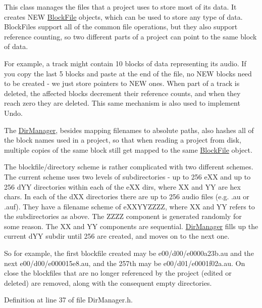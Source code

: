 This class manages the files that a project uses to store most of its data. It creates N\+EW \hyperlink{class_block_file}{Block\+File} objects, which can be used to store any type of data. Block\+Files support all of the common file operations, but they also support reference counting, so two different parts of a project can point to the same block of data.

For example, a track might contain 10 blocks of data representing its audio. If you copy the last 5 blocks and paste at the end of the file, no N\+EW blocks need to be created -\/ we just store pointers to N\+EW ones. When part of a track is deleted, the affected blocks decrement their reference counts, and when they reach zero they are deleted. This same mechanism is also used to implement Undo.

The \hyperlink{class_dir_manager}{Dir\+Manager}, besides mapping filenames to absolute paths, also hashes all of the block names used in a project, so that when reading a project from disk, multiple copies of the same block still get mapped to the same \hyperlink{class_block_file}{Block\+File} object.

The blockfile/directory scheme is rather complicated with two different schemes. The current scheme uses two levels of subdirectories -\/ up to 256 \textquotesingle{}e\+XX\textquotesingle{} and up to 256 \textquotesingle{}d\+YY\textquotesingle{} directories within each of the \textquotesingle{}e\+XX\textquotesingle{} dirs, where XX and YY are hex chars. In each of the d\+XX directories there are up to 256 audio files (e.\+g. .au or .auf). They have a filename scheme of \textquotesingle{}e\+X\+X\+Y\+Y\+Z\+Z\+ZZ\textquotesingle{}, where XX and YY refers to the subdirectories as above. The \textquotesingle{}Z\+Z\+ZZ\textquotesingle{} component is generated randomly for some reason. The XX and YY components are sequential. \hyperlink{class_dir_manager}{Dir\+Manager} fills up the current d\+YY subdir until 256 are created, and moves on to the next one.

So for example, the first blockfile created may be \textquotesingle{}e00/d00/e0000a23b.\+au\textquotesingle{} and the next \textquotesingle{}e00/d00/e000015e8.\+au\textquotesingle{}, and the 257th may be \textquotesingle{}e00/d01/e0001f02a.\+au\textquotesingle{}. On close the blockfiles that are no longer referenced by the project (edited or deleted) are removed, along with the consequent empty directories. 

Definition at line 37 of file Dir\+Manager.\+h.



